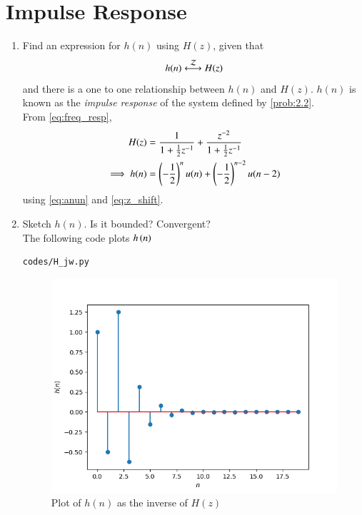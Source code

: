 \documentclass[journal,12pt,twocolumn]{IEEEtran}
\theoremstyle{remark}
\begin{document}
\section{Impulse Response}
\begin{enumerate}[label=\thesection.\arabic*]
\item \label{prob:impulse_resp}
Find an expression for $h(n)$ using $H(z)$, given that 
\begin{equation}
    h(n) \system{Z} H(z)
    \label{eq:impulse_resp}
\end{equation}
and there is a one to one relationship between $h(n)$ and $H(z)$. $h(n)$ is known as the {\em impulse response} of the
system defined by \eqref{prob:2.2}.\\
\solution From \eqref{eq:freq_resp},
\begin{align}
H(z) &= \frac{1}{1 + \frac{1}{2}z^{-1}} + \frac{ z^{-2}}{1 + \frac{1}{2}z^{-1}}\\
\implies h(n) &= \left(-\frac{1}{2}\right)^{n}u(n) + \left(-\frac{1}{2}\right)^{n-2}u(n-2)
\end{align}
using \eqref{eq:anun} and \eqref{eq:z_shift}.

\item Sketch $h(n)$. Is it bounded? Convergent? 
\\
\solution The following code plots $h\left(n\right)$ 
\begin{lstlisting}
codes/H_jw.py
\end{lstlisting}
\begin{figure}[ht]
    \centering
    \includegraphics[width=\columnwidth]{figs/h_n.png}
    \caption{Plot of $h(n)$ as the inverse of $H(z)$}
    \label{fig:hn}
\end{figure}


\end{enumerate}
\end{document}

